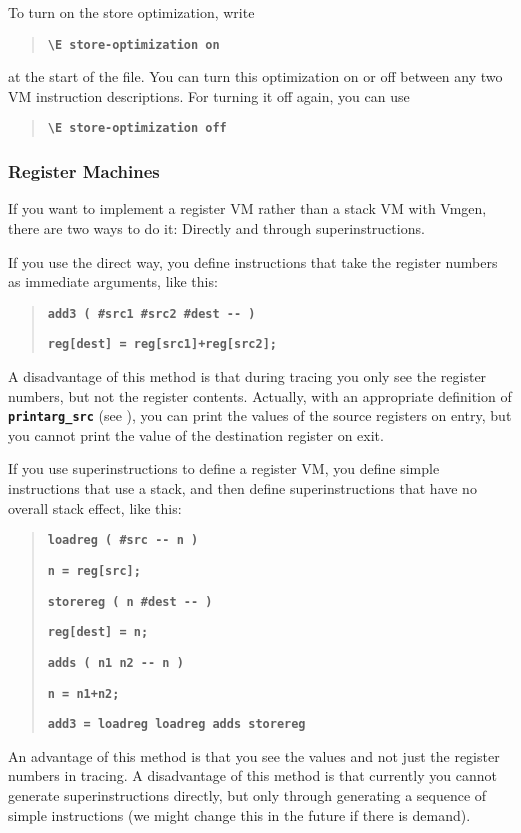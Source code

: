 \documentclass[10pt,english]{article}
\begin{document}
To turn on the store optimization, write
\begin{quotation}
\texttt{\textbf{\textbackslash{}E store-optimization on}}
\end{quotation}
at the start of the file. You can turn this optimization on or off
between any two VM instruction descriptions. For turning it off again,
you can use
\begin{quotation}
\texttt{\textbf{\textbackslash{}E store-optimization off}}
\end{quotation}

\subsubsection{Register Machines\label{sub:Register-Machines}}

If you want to implement a register VM rather than a stack VM with
Vmgen, there are two ways to do it: Directly and through superinstructions.

If you use the direct way, you define instructions that take the register
numbers as immediate arguments, like this:
\begin{quotation}
\texttt{\textbf{add3 ( \#src1 \#src2 \#dest -{}- )}}

\texttt{\textbf{reg{[}dest{]} = reg{[}src1{]}+reg{[}src2{]};}}
\end{quotation}
A disadvantage of this method is that during tracing you only see
the register numbers, but not the register contents. Actually, with
an appropriate definition of \texttt{\textbf{printarg\_src}} (see
), you can print the values of the source
registers on entry, but you cannot print the value of the destination
register on exit.

If you use superinstructions to define a register VM, you define simple
instructions that use a stack, and then define superinstructions that
have no overall stack effect, like this:
\begin{quotation}
\texttt{\textbf{loadreg ( \#src -{}- n )}}

\texttt{\textbf{n = reg{[}src{]};}}

\texttt{\textbf{storereg ( n \#dest -{}- )}}

\texttt{\textbf{reg{[}dest{]} = n;}}

\texttt{\textbf{adds ( n1 n2 -{}- n )}}

\texttt{\textbf{n = n1+n2;}}

\texttt{\textbf{add3 = loadreg loadreg adds storereg}}
\end{quotation}
An advantage of this method is that you see the values and not just
the register numbers in tracing. A disadvantage of this method is
that currently you cannot generate superinstructions directly, but
only through generating a sequence of simple instructions (we might
change this in the future if there is demand).
\end{document}
